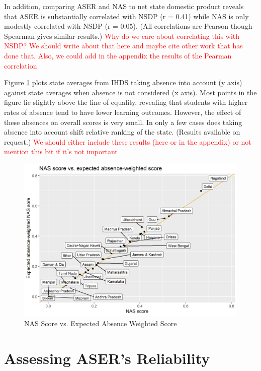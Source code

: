 \documentclass[
  11pt,
]{article}
\begin{document}
In addition, comparing ASER and NAS to net state domestic product reveals that ASER is substantially correlated with NSDP (r = 0.41) while NAS is only modestly correlated with NSDP (r = 0.05). (All correlations are Pearson though Spearman gives similar results.) \textcolor{red}{Why do we care about correlating this with NSDP? We should write about that here and maybe cite other work that has done that. Also, we could add in the appendix the results of the Pearman correlation}

Figure \ref{fig:weighted} plots state averages from IHDS taking absence into account (y axis) against state averages when absence is not considered (x axis). Most points in the figure lie slightly above the line of equality, revealing that students with higher rates of absence tend to have lower learning outcomes. However, the effect of these absences on overall scores is very small. In only a few cases does taking absence into account shift relative ranking of the state. (Results available on request.) \textcolor{red}{We should either include these results (here or in the appendix) or not mention this bit if it's not important}

\begin{figure}

{\centering \includegraphics[width=0.8\linewidth]{absence_weighted_aser} 

}

\caption{NAS Score vs. Expected Absence Weighted Score}\label{fig:weighted}
\end{figure}

\hypertarget{aserinternal}{%
\section{Assessing ASER's Reliability}\label{aserinternal}}
\end{document}
